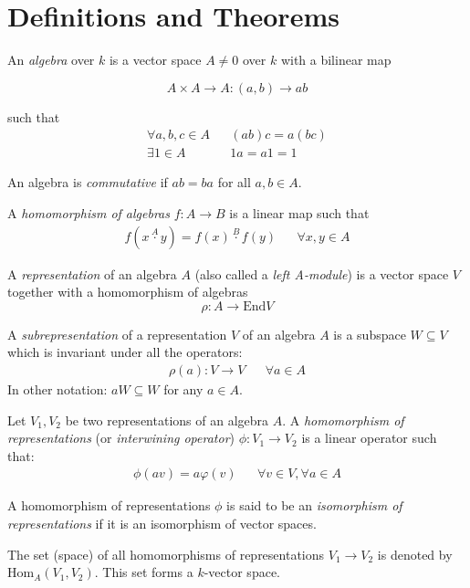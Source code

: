 \section{Definitions and Theorems}

\begin{defn}
An \emph{algebra} over \(k\) is a vector space \(A\neq 0\) over \(k\) with a bilinear map

\[A \times  A\rightarrow A: (a,b) \rightarrow ab\]

such that \begin{align*}\forall a,b,c\in A && (ab)c=a(bc) \\
\exists 1\in A && 1a=a1=1\end{align*}

An algebra is \emph{commutative} if \(ab=ba\) for all \(a,b\in A\).
\end{defn}

\begin{defn}
A \emph{homomorphism of algebras} \(f:A\rightarrow B\) is a linear map such that 
\begin{align*}f(x\overset{A}{\cdot } y)=f(x)\overset{B}{\cdot } f(y) &&\forall x,y\in A\end{align*}

\end{defn}

\begin{defn}
A \emph{representation} of an algebra \(A\) (also called a \emph{left A-module}) is a vector space \(V\) together with a homomorphism of algebras 
$$\rho  : A \rightarrow \text{End}V$$
\end{defn}

\begin{defn}
A \emph{subrepresentation} of a representation \(V\) of an algebra \(A\) is a subspace \(W\subseteq V\) which is invariant under all the operators: 
\begin{align*}\rho (a):V \rightarrow V && \forall a\in A\end{align*}
In other notation: \(aW\subseteq W\) for any \(a\in A.\)
\end{defn}

\begin{defn}
Let \(V_{1},V_{2}\) be two representations of an algebra \(A\). A \emph{homomorphism of representations} (or \emph{interwining operator}) \(\phi :V_{1}\rightarrow V_{2}\) is a linear operator such that:
\begin{align*}\phi (av)=a\varphi (v) &&\forall v\in V,\forall a\in A\end{align*}

A homomorphism of representations \(\phi \) is said to be an \emph{isomorphism of representations} if it is an isomorphism of vector spaces. 

The set (space) of all homomorphisms of representations \(V_{1}\rightarrow V_{2}\) is denoted by \(\text{Hom}_{A} (V_{1},V_{2})\). This set forms a \(k\)-vector space. 
\end{defn}

